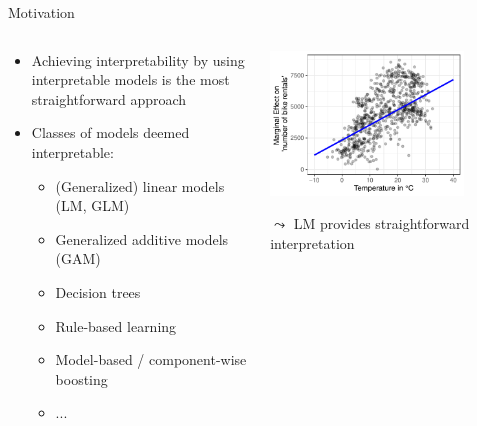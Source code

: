 \documentclass[10pt,compress,t,notes=noshow, xcolor=table]{beamer}
\date{}
\begin{document}
 



\begin{frame}{Motivation}
\begin{columns}[T, totalwidth = \textwidth]
    \begin{column}{0.58\textwidth}
    \begin{itemize}
       \item Achieving interpretability by using interpretable models is the most straightforward approach
         \item Classes of models deemed interpretable:
   \begin{itemize}
  \footnotesize
  \item (Generalized) linear models (LM, GLM)
  \item Generalized additive models (GAM)
  \item Decision trees
  \item Rule-based learning
  \item Model-based / component-wise boosting
  \item ...
\end{itemize}
    \end{itemize}
    

    \end{column}
    \begin{column}{0.42\textwidth}  %
    \centering
  \includegraphics[width = 0.8\textwidth]{figure/main_effect_lm_temp.pdf}
  \begin{center}
    $\leadsto$ LM provides straightforward interpretation
  \end{center}


\end{column}
\end{columns}
\end{frame}
\end{document}
